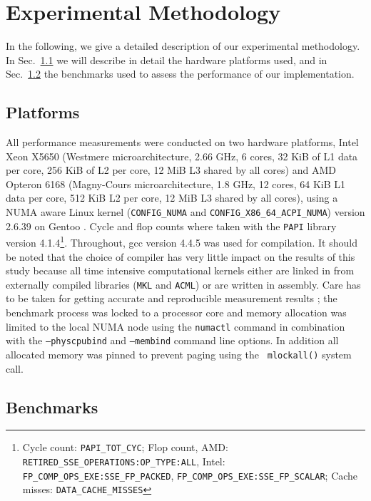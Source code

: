 \section{Experimental Methodology}
\label{sec:methodology}

In the following, we give a detailed description of our experimental
methodology. In Sec.~\ref{sec:platforms} we will describe in detail the
hardware platforms used, and in Sec.~\ref{sec:benchmarks} the benchmarks used
to assess the performance of our implementation.

\subsection{Platforms}
\label{sec:platforms}

All performance measurements were conducted on two hardware platforms, Intel
Xeon X5650 (Westmere microarchitecture, 2.66 GHz, 6 cores, 32 KiB of L1 data
per core, 256 KiB of L2 per core, 12 MiB L3 shared by all cores) and AMD
Opteron 6168 (Magny-Cours microarchitecture, 1.8 GHz, 12 cores, 64 KiB L1 data
per core, 512 KiB L2 per core, 12 MiB L3 shared by all cores), using a NUMA
aware Linux kernel ({\tt CONFIG\_NUMA} and {\tt CONFIG\_X86\_64\_ACPI\_NUMA})
version 2.6.39 on Gentoo \cite{gentoo}.  Cycle and flop counts where taken
with the {\tt PAPI} library \cite{papi, Mucci99papi:a, 5936277} version
4.1.4\footnote{Cycle count: {\tt PAPI\_TOT\_CYC}; Flop count, AMD: {\tt
RETIRED\_SSE\_OPERATIONS:OP\_TYPE:ALL}, Intel: {\tt
FP\_COMP\_OPS\_EXE:SSE\_FP\_PACKED}, {\tt FP\_COMP\_OPS\_EXE:SSE\_FP\_SCALAR};
Cache misses: {\tt DATA\_CACHE\_MISSES}}. Throughout, gcc \cite{gcc} version
4.4.5 was used for compilation. It should be noted that the choice of compiler
has very little impact on the results of this study because all time intensive
computational kernels either are linked in from externally compiled libraries
({\tt MKL} and {\tt ACML}) or are written in assembly.  Care has to be taken
for getting accurate and reproducible measurement results \cite{Weaver2008};
the benchmark process was locked to a processor core and memory allocation was
limited to the local NUMA node using the {\tt numactl} command in combination
with the {\tt --physcpubind} and {\tt --membind} command line options. In
addition all allocated memory was pinned to prevent paging using the {\tt
mlockall()} system call.

\subsection{Benchmarks}
\label{sec:benchmarks}

